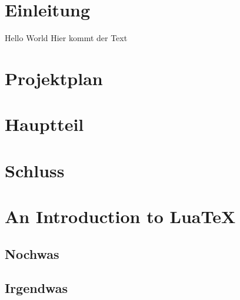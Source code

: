 \documentclass[10pt]{report}
\newcommand{\titel}{$Titel der Arbeit}
\newcommand{\desc}{$Name des Leistungsnachweis}
\newcommand{\authors}{$Authoren}
\newcommand{\lecturer}{$Betreuer}
\newcommand{\module}{$Modul oder $Kurs}
\begin{document}

\newpage 

\tableofcontents
\listoffigures
\listoftables

\newpage
\chapter{Einleitung}

Hello World \cite{LUNDY20151057} Hier kommt der Text

\chapter{Projektplan}


\chapter{Hauptteil}

\chapter{Schluss}

\newpage
\appendix
\chapter{An Introduction to Lua\TeX}
\section{Nochwas}
\section{Irgendwas}

\newpage
\printbibliography
\end{document}
